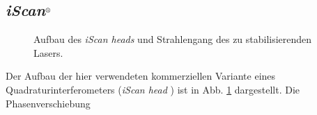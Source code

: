 \subsection{\textit{iScan}$^\text{\textregistered}$}\label{subsec:iScan}
\begin{figure}[h]
 	\centering
	\caption[\textit{iScan head} - Aufbau]{Aufbau
	des \textit{iScan heads} und Strahlengang des zu
	stabilisierenden Lasers.}
	\label{fig:iscan_aufbau}
\end{figure}
Der Aufbau der hier verwendeten kommerziellen Variante eines
Quadraturinterferometers (\textit{iScan head} \cite{iscan_hardware_guide}) ist
in Abb.
\ref{fig:iscan_aufbau} dargestellt. Die Phasenverschiebung
